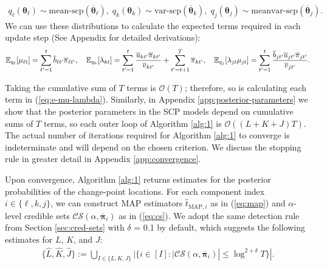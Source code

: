 \begin{align}
    q_\ell(\boldsymbol{\theta}_\ell) \sim \text{mean-scp}(\overline{\boldsymbol{\theta}}_\ell), \; q_k(\boldsymbol{\theta}_k) \sim \text{var-scp}(\overline{\boldsymbol{\theta}}_k) ,\; q_j(\boldsymbol{\theta}_j) \sim \text{meanvar-scp}(\overline{\boldsymbol{\theta}}_j). \label{eq:q-LKJ}
\end{align}
We can use these distributions to calculate the expected terms required in each update step (See Appendix for detailed derivations):
\small
\begin{align}
    \mathbb{E}_{q_\ell}[\mu_{\ell t}] = \sum_{t'=1}^t \overline{b}_{\ell t'} \overline{\pi}_{\ell t'},\quad \mathbb{E}_{q_k}[\lambda_{kt}] = \sum_{t'=1}^{t} \frac{\overline{u}_{kt'}\overline{\pi}_{kt'}}{\overline{v}_{kt'}}  + \sum_{t'=t+1}^T \overline{\pi}_{kt'},\quad \mathbb{E}_{q_j}[\lambda_{jt}\mu_{jt}] =  \sum_{t'=1}^t \frac{\overline{b}_{j t'}\overline{u}_{jt'}\overline{\pi}_{jt'} }{\overline{v}_{jt'}}. \label{eq:e-mu-lambda}
\end{align}
\normalsize

\begin{remark} \label{rmk:computational-complexity}
    Taking the cumulative sum of $T$ terms is $\mathcal{O}(T)$; therefore, so is calculating each term in (\ref{eq:e-mu-lambda}). Similarly, in Appendix \ref{app:posterior-parameters} we show that the posterior parameters in the SCP models depend on cumulative sums of $T$ terms, so each outer loop of Algorithm \ref{alg:1} is $\mathcal{O}((L+K+J)T)$. The actual number of iterations required for Algorithm \ref{alg:1} to converge is indeterminate and will depend on the chosen criterion. We discuss the stopping rule in greater detail in Appendix \ref{app:convergence}. 
\end{remark}

Upon convergence, Algorithm \ref{alg:1} returns estimates for the posterior probabilities of the change-point locations. For each component index $i \in \{\ell, k, j\}$, we can construct MAP estimators $\hat{t}_{\text{MAP}, i}$  as in (\ref{eq:map}) and $\alpha$-level credible sets $\mathcal{CS}(\alpha, \overline{\boldsymbol{\pi}}_i)$ as in (\ref{eq:cs}). We adopt the same detection rule from Section \ref{sec:cred-sets} with $\delta$ = 0.1 by default, which suggests the following estimates for $L$, $K$, and $J$: 
\begin{align}
    \{\hat{L},\hat{K},\hat{J}\}  := \bigcup_{I \in \{L,K,J\}}|\{ i \in [I] : |\mathcal{CS}(\alpha, \overline{\boldsymbol{\pi}}_i)| \leq \log^{2+\delta} T\}|. \label{eq:LKJ-estimator}
\end{align}

